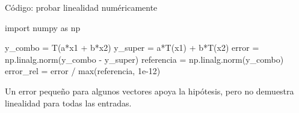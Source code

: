 \documentclass[
  ignorenonframetext,
  aspectratio=169,
  spanish,
]{beamer}
\newenvironment{Shaded}{\begin{snugshade}}{\end{snugshade}}
\newcommand{\BuiltInTok}[1]{\textcolor[rgb]{0.00,0.23,0.31}{#1}}
\newcommand{\FloatTok}[1]{\textcolor[rgb]{0.68,0.00,0.00}{#1}}
\newcommand{\ImportTok}[1]{\textcolor[rgb]{0.00,0.46,0.62}{#1}}
\newcommand{\NormalTok}[1]{\textcolor[rgb]{0.00,0.23,0.31}{#1}}
\newcommand{\OperatorTok}[1]{\textcolor[rgb]{0.37,0.37,0.37}{#1}}
\begin{document}
\begin{frame}[fragile]{Código: probar linealidad numéricamente}
  \protect{}\label{cuxf3digo-probar-linealidad-numuxe9ricamente}
  \begin{Shaded}
    \begin{Highlighting}[]
      \ImportTok{import}\NormalTok{ numpy }\ImportTok{as}\NormalTok{ np}

      \NormalTok{y\_combo }\OperatorTok{=}\NormalTok{ T(a}\OperatorTok{*}\NormalTok{x1 }\OperatorTok{+}\NormalTok{ b}\OperatorTok{*}\NormalTok{x2)}
      \NormalTok{y\_super }\OperatorTok{=}\NormalTok{ a}\OperatorTok{*}\NormalTok{T(x1) }\OperatorTok{+}\NormalTok{ b}\OperatorTok{*}\NormalTok{T(x2)}
      \NormalTok{error }\OperatorTok{=}\NormalTok{ np.linalg.norm(y\_combo }\OperatorTok{{-}}\NormalTok{ y\_super)}
      \NormalTok{referencia }\OperatorTok{=}\NormalTok{ np.linalg.norm(y\_combo)}
      \NormalTok{error\_rel }\OperatorTok{=}\NormalTok{ error }\OperatorTok{/} \BuiltInTok{max}\NormalTok{(referencia, }\FloatTok{1e{-}12}\NormalTok{)}
    \end{Highlighting}
  \end{Shaded}

  \begin{tcolorbox}[enhanced jigsaw, arc=.35mm, bottomrule=.15mm, bottomtitle=1mm, breakable, colback=white, colbacktitle=quarto-callout-warning-color!10!white, colframe=quarto-callout-warning-color-frame, coltitle=black, left=2mm, leftrule=.75mm, opacityback=0, opacitybacktitle=0.6, rightrule=.15mm, title=\textcolor{quarto-callout-warning-color}{\faExclamationTriangle}\hspace{0.5em}{Advertencia}, titlerule=0mm, toprule=.15mm, toptitle=1mm]

    Un error pequeño para algunos vectores apoya la hipótesis, pero no
    demuestra linealidad para todas las entradas.

  \end{tcolorbox}
\end{frame}
\end{document}
